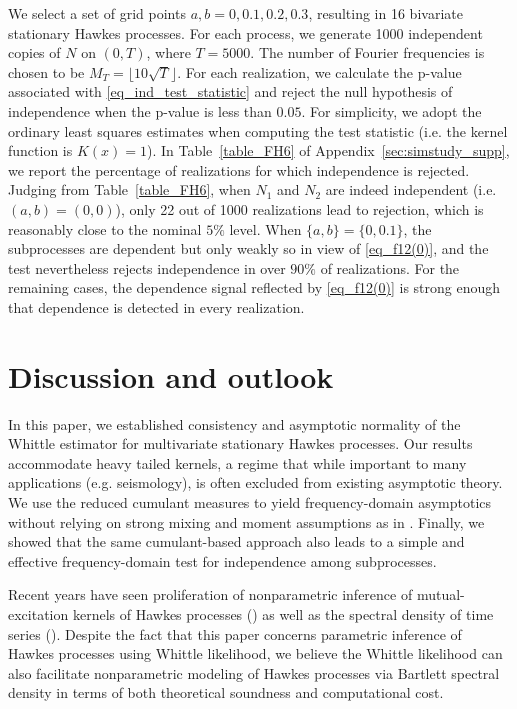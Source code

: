\documentclass[11pt]{article}
\numberwithin{equation}{section}
\theoremstyle{plain}
\theoremstyle{definition}
\theoremstyle{definition}
\theoremstyle{assumption}
\theoremstyle{proposition}
\theoremstyle{proposition}
\theoremstyle{example}
\theoremstyle{lemma}
\theoremstyle{theorem}
\theoremstyle{remark}
\begin{document}
We select a set of grid points $a,b=0,0.1,0.2,0.3$, resulting in 16 bivariate stationary Hawkes processes. For each process, we generate 1000 independent copies of $N$ on $(0,T)$, where $T=5000$. The number of Fourier frequencies is chosen to be $M_T=\lfloor 10\sqrt{T}\rfloor$. 
For each realization, we calculate the p-value associated with \eqref{eq_ind_test_statistic} and reject the null hypothesis of independence when the p-value is less than $0.05$. For simplicity, we adopt the ordinary least squares estimates when computing the test statistic (i.e. the kernel function is $K(x)=1$). In Table~\ref{table_FH6} of Appendix~\ref{sec:simstudy_supp}, we report the percentage of realizations for which independence is rejected. Judging from Table~\ref{table_FH6}, when $N_1$ and $N_2$ are indeed independent (i.e.\ $(a,b)=(0,0)$), only 22 out of 1000 realizations lead to rejection, which is reasonably close to the nominal $5\%$ level. When $\{a,b\}=\{0,0.1\}$, the subprocesses are dependent but only weakly so in view of \eqref{eq_f12(0)}, and the test nevertheless rejects independence in over $90\%$ of realizations. For the remaining cases, the dependence signal reflected by \eqref{eq_f12(0)} is strong enough that dependence is detected in every realization.

\section{Discussion and outlook}\label{section_conclusion}
In this paper, we established consistency and asymptotic normality of the Whittle estimator for multivariate stationary Hawkes processes. Our results accommodate heavy tailed kernels, a regime that while important to many applications (e.g. seismology), is often excluded from existing asymptotic theory. We use the reduced cumulant measures to yield frequency-domain asymptotics without relying on strong mixing and moment assumptions as in \citet{Cheysson2022_and_Lang2022}. Finally, we showed that the same cumulant-based approach also leads to a simple and effective frequency-domain test for independence among subprocesses.

Recent years have seen proliferation of nonparametric inference of mutual-excitation kernels of Hawkes processes (\citealp{Bonnet_and_Sangnier2025,Kim_and_Iwata2026}) as well as the spectral density of time series (\citealp{Tang_et_al2026}). Despite the fact that this paper concerns parametric inference of Hawkes processes using Whittle likelihood, we believe the Whittle likelihood can also facilitate nonparametric modeling of Hawkes processes via Bartlett spectral density in terms of both theoretical soundness and computational cost.
\end{document}
